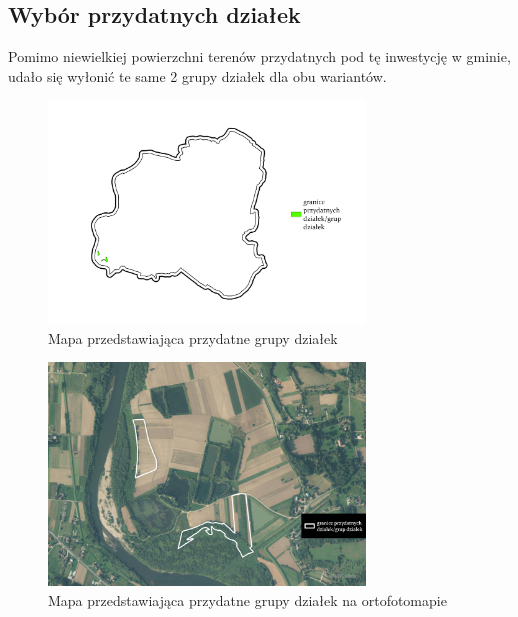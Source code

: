 \documentclass{article}
\begin{document}
\subsection{Wybór przydatnych działek}

Pomimo niewielkiej powierzchni terenów przydatnych pod tę inwestycję w gminie, udało się wyłonić te same 2 grupy działek dla obu wariantów.

\begin{figure}[H]
    \centering
    \includegraphics[width=0.75\textwidth]{img/plesna-przydatne-dzialki.jpg}
    \caption{Mapa przedstawiająca przydatne grupy działek}
\end{figure}

\begin{figure}[H]
    \centering
    \includegraphics[width=0.75\textwidth]{img/plesna-dzialki-przydatne-ortofoto.jpg}
    \caption{Mapa przedstawiająca przydatne grupy działek na ortofotomapie}
\end{figure}
\vspace{10pt}
\end{document}

